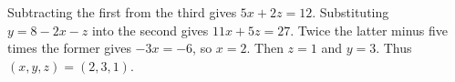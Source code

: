 Subtracting the first from the third gives $5x+2z=12$. Substituting $y=8-2x-z$ into the second gives $11x+5z=27$. Twice the latter minus five times the former gives $-3x=-6$, so $x=2$. Then $z=1$ and $y=3$. Thus $\boxed{(x,y,z)=(2,3,1)}$.
